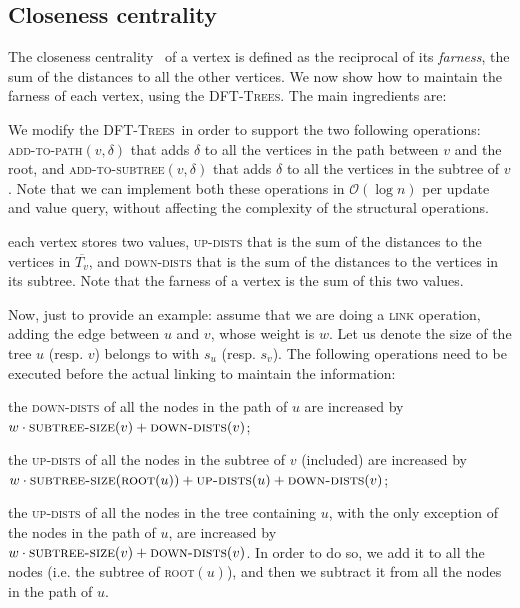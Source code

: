 \documentclass[a4paper,USenglish]{lipics}
\newcommand{\bigoh}{\mathcal{O}}
\newcommand{\dfts}{\textsc{DFT-Trees}}
\begin{document}
\subsection{Closeness centrality}
\label{sub:cc}
The closeness centrality~\cite{Bav50} of a vertex is defined as the reciprocal of its \emph{farness}, the sum of the distances to all the other vertices. We now show how to maintain the farness of each vertex, using the \dfts. The main ingredients are:
\begin{compactitem}
\item We modify the \dfts\ in order to support the two following operations: \textsc{add-to-path}$(v,\delta)$ that adds $\delta$ to all the vertices in the path between $v$ and the root, and \textsc{add-to-subtree}$(v,\delta)$ that adds $\delta$ to all the vertices in the subtree of $v$. Note that we can implement both these operations in $\bigoh (\log n)$ per update and value query, without affecting the complexity of the structural operations.
\item each vertex stores two values, \textsc{up-dists} that is the sum of the distances to the vertices in $\overline{T_v}$, and \textsc{down-dists} that is the sum of the distances to the vertices in its subtree. Note that the farness of a vertex is the sum of this two values. 
\end{compactitem}
Now, just to provide an example: assume that we are doing a \textsc{link} operation, adding the edge between $u$ and $v$, whose weight is $w$. Let us denote the size of the tree $u$ (resp. $v$) belongs to with $s_u$ (resp. $s_v$). The following operations need to be executed before the actual linking to maintain the information:
\begin{compactitem}
\item the \textsc{down-dists} of all the nodes in the path of $u$ are increased by $w\cdot\textsc{subtree-size}(v) + \textsc{down-dists}(v)$;
\item the \textsc{up-dists} of all the nodes in the subtree of $v$ (included) are increased by $w\cdot\textsc{subtree-size}(\textsc{root}(u)) + \textsc{up-dists}(u) + \textsc{down-dists}(v)$;
\item the \textsc{up-dists} of all the nodes in the tree containing $u$, with the only exception of the nodes in the path of $u$, are increased by $w\cdot\textsc{subtree-size}(v) + \textsc{down-dists}(v)$. In order to do so, we add it to all the nodes (i.e. the subtree of \textsc{root}$(u)$), and then we subtract it from all the nodes in the path of $u$. 
\end{compactitem}
\end{document}
